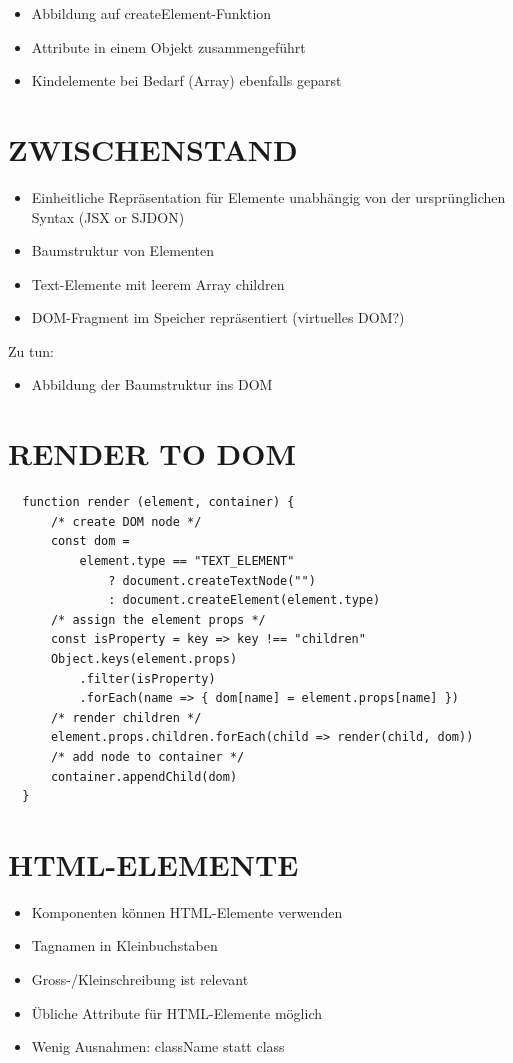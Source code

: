   \begin{itemize}
    \item Abbildung auf createElement-Funktion
    \item Attribute in einem Objekt zusammengeführt
    \item Kindelemente bei Bedarf (Array) ebenfalls geparst
  \end{itemize}
  
  \section*{ZWISCHENSTAND}
  \begin{itemize}
    \item Einheitliche Repräsentation für Elemente unabhängig von der ursprünglichen Syntax (JSX or SJDON)
    \item Baumstruktur von Elementen
    \item Text-Elemente mit leerem Array children
    \item DOM-Fragment im Speicher repräsentiert (virtuelles DOM?)
  \end{itemize}
  
  Zu tun:
  
  \begin{itemize}
    \item Abbildung der Baumstruktur ins DOM
  \end{itemize}
  
  \section*{RENDER TO DOM}
  \begin{verbatim}
  function render (element, container) {
      /* create DOM node */
      const dom =
          element.type == "TEXT_ELEMENT"
              ? document.createTextNode("")
              : document.createElement(element.type)
      /* assign the element props */
      const isProperty = key => key !== "children"
      Object.keys(element.props)
          .filter(isProperty)
          .forEach(name => { dom[name] = element.props[name] })
      /* render children */
      element.props.children.forEach(child => render(child, dom))
      /* add node to container */
      container.appendChild(dom)
  }
  \end{verbatim}
  
  \section*{HTML-ELEMENTE}
  \begin{itemize}
    \item Komponenten können HTML-Elemente verwenden
    \item Tagnamen in Kleinbuchstaben
    \item Gross-/Kleinschreibung ist relevant
    \item Übliche Attribute für HTML-Elemente möglich
    \item Wenig Ausnahmen: className statt class
  \end{itemize}
  
